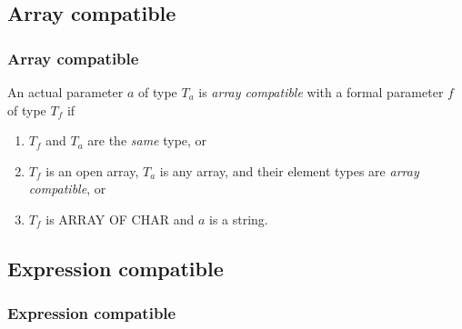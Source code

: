 \ifonline
\subsection{Array compatible}
\else
\subsubsection{Array compatible}
\fi

An actual parameter $a$ of type $T_a$ is {\em array compatible} with a formal
parameter $f$ of type $T_f$ if
\begin{enumerate}
\item
$T_f$ and $T_a$ are the {\em same} type, or
\item
$T_f$ is an open array, $T_a$ is any array, and their
element types are {\em array compatible}, or
\item
$T_f$ is ARRAY OF CHAR and $a$ is a string.
\end{enumerate}

\ifonline
\subsection{Expression compatible}
\else
\subsubsection{Expression compatible}
\fi

